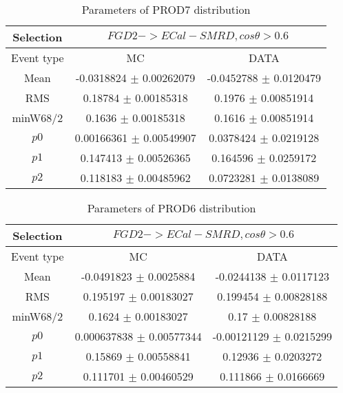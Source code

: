\documentclass[a4paper,12pt]{article}
\begin{document}
\begin{table}[htbp]
\begin{center}
\begin{tabular}{|c|c|c|}
        \hline
        Selection & \multicolumn{2}{|c|}{$FGD2->ECal-SMRD, cos\theta>0.6$}  \\ \hline
        Event type & MC & DATA \\ 
        \hline
        Mean & -0.0318824 $\pm$ 0.00262079 & -0.0452788 $\pm$ 0.0120479 \\ 
        \hline 
        RMS & 0.18784 $\pm$ 0.00185318 & 0.1976 $\pm$ 0.00851914 \\ 
        \hline 
        minW68/2 & 0.1636 $\pm$ 0.00185318 & 0.1616 $\pm$ 0.00851914 \\ 
        \hline 
        $p0$ & 0.00166361 $\pm$ 0.00549907 & 0.0378424 $\pm$ 0.0219128 \\ 
        \hline 
        $p1$ & 0.147413 $\pm$ 0.00526365 & 0.164596 $\pm$ 0.0259172 \\ 
        \hline 
        $p2$ & 0.118183 $\pm$ 0.00485962 & 0.0723281 $\pm$ 0.0138089 \\ 
        \hline 
\end{tabular}
\caption{Parameters of PROD7 distribution } \vspace{0.2in}
\label{xxx}
\end{center}
\end{table}
\begin{table}[htbp]
\begin{center}
\begin{tabular}{|c|c|c|}
        \hline
        Selection & \multicolumn{2}{|c|}{$FGD2->ECal-SMRD, cos\theta>0.6$}  \\ \hline
        Event type & MC & DATA \\ 
        \hline
        Mean & -0.0491823 $\pm$ 0.0025884 & -0.0244138 $\pm$ 0.0117123 \\ 
        \hline 
        RMS & 0.195197 $\pm$ 0.00183027 & 0.199454 $\pm$ 0.00828188 \\ 
        \hline 
        minW68/2 & 0.1624 $\pm$ 0.00183027 & 0.17 $\pm$ 0.00828188 \\ 
        \hline 
        $p0$ & 0.000637838 $\pm$ 0.00577344 & -0.00121129 $\pm$ 0.0215299 \\ 
        \hline 
        $p1$ & 0.15869 $\pm$ 0.00558841 & 0.12936 $\pm$ 0.0203272 \\ 
        \hline 
        $p2$ & 0.111701 $\pm$ 0.00460529 & 0.111866 $\pm$ 0.0166669 \\ 
        \hline 
\end{tabular}
\caption{Parameters of PROD6 distribution } \vspace{0.2in}
\label{xxx}
\end{center}
\end{table}
\end{document}
